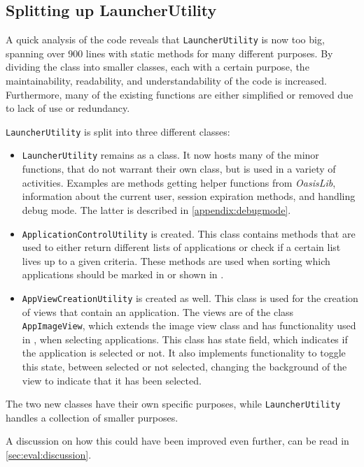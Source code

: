 \subsection{Splitting up LauncherUtility}\label{sect:sprint4:refactoring}

A quick analysis of the code reveals that \lstinline|LauncherUtility| is now too big, spanning over 900 lines with static methods for many different purposes.
By dividing the class into smaller classes, each with a certain purpose, the maintainability, readability, and understandability of the code is increased.
Furthermore, many of the existing functions are either simplified or removed due to lack of use or redundancy.

\lstinline|LauncherUtility| is split into three different classes:

\begin{itemize}
\item \lstinline|LauncherUtility| remains as a class.
It now hosts many of the minor functions, that do not warrant their own class, but is used in a variety of activities.
Examples are methods getting helper functions from \textit{OasisLib}, information about the current user, session expiration methods, and handling debug mode.
The latter is described in \cref{appendix:debugmode}.
\item \lstinline|ApplicationControlUtility| is created.
This class contains methods that are used to either return different lists of applications or check if a certain list lives up to a given criteria.
These methods are used when sorting which applications should be marked in \settingsactivity or shown in \homeactivity.
\item \lstinline|AppViewCreationUtility| is created as well.
This class is used for the creation of views that contain an application.
The views are of the class \lstinline|AppImageView|, which extends the image view class and has functionality used in \settingsactivity, when selecting applications. 
This class has state field, which indicates if the application is selected or not. 
It also implements functionality to toggle this state, between selected or not selected, changing the background of the view to indicate that it has been selected.
\end{itemize}

The two new classes have their own specific purposes, while \lstinline|LauncherUtility| handles a collection of smaller purposes.

A discussion on how this could have been improved even further, can be read in \cref{sec:eval:discussion}.